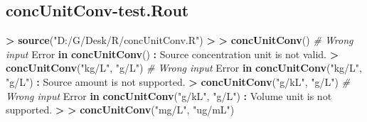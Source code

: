 \documentclass[10pt,]{krantz}
\makeatletter
\newenvironment{Shaded}{\begin{snugshade}}{\end{snugshade}}
\newcommand{\KeywordTok}[1]{\textcolor[rgb]{0.13,0.29,0.53}{\textbf{#1}}}
\newcommand{\StringTok}[1]{\textcolor[rgb]{0.31,0.60,0.02}{#1}}
\newcommand{\CommentTok}[1]{\textcolor[rgb]{0.56,0.35,0.01}{\textit{#1}}}
\newcommand{\ControlFlowTok}[1]{\textcolor[rgb]{0.13,0.29,0.53}{\textbf{#1}}}
\newcommand{\OperatorTok}[1]{\textcolor[rgb]{0.81,0.36,0.00}{\textbf{#1}}}
\newcommand{\ErrorTok}[1]{\textcolor[rgb]{0.64,0.00,0.00}{\textbf{#1}}}
\newcommand{\NormalTok}[1]{#1}
\newenvironment{kframe}{%
\medskip{}
\setlength{\fboxsep}{.8em}
 \def\at@end@of@kframe{}%
 \ifinner\ifhmode%
  \def\at@end@of@kframe{\end{minipage}}%
  \begin{minipage}{\columnwidth}%
 \fi\fi%
 \def\FrameCommand##1{\hskip\@totalleftmargin \hskip-\fboxsep
 \colorbox{shadecolor}{##1}\hskip-\fboxsep
     \hskip-\linewidth \hskip-\@totalleftmargin \hskip\columnwidth}%
 \MakeFramed {\advance\hsize-\width
   \@totalleftmargin\z@ \linewidth\hsize
   \@setminipage}}%
 {\par\unskip\endMakeFramed%
 \at@end@of@kframe}
\renewenvironment{Shaded}{\begin{kframe}}{\end{kframe}}
\theoremstyle{definition}
\theoremstyle{definition}
\theoremstyle{remark}
\makeatother
\begin{document}
\subsection{concUnitConv-test.Rout}\label{concunitconv-test.rout}

\begin{Shaded}
\begin{Highlighting}[]
\OperatorTok{>}\StringTok{ }\KeywordTok{source}\NormalTok{(}\StringTok{"D:/G/Desk/R/concUnitConv.R"}\NormalTok{)}
\OperatorTok{>}\StringTok{ }
\ErrorTok{>}\StringTok{ }\KeywordTok{concUnitConv}\NormalTok{() }\CommentTok{# Wrong input}
\NormalTok{Error }\ControlFlowTok{in} \KeywordTok{concUnitConv}\NormalTok{() }\OperatorTok{:}\StringTok{ }\NormalTok{Source concentration unit is not valid.}
\OperatorTok{>}\StringTok{ }\KeywordTok{concUnitConv}\NormalTok{(}\StringTok{"kg/L"}\NormalTok{, }\StringTok{"g/L"}\NormalTok{) }\CommentTok{# Wrong input}
\NormalTok{Error }\ControlFlowTok{in} \KeywordTok{concUnitConv}\NormalTok{(}\StringTok{"kg/L"}\NormalTok{, }\StringTok{"g/L"}\NormalTok{) }\OperatorTok{:}\StringTok{ }\NormalTok{Source amount is not supported.}
\OperatorTok{>}\StringTok{ }\KeywordTok{concUnitConv}\NormalTok{(}\StringTok{"g/kL"}\NormalTok{, }\StringTok{"g/L"}\NormalTok{) }\CommentTok{# Wrong input}
\NormalTok{Error }\ControlFlowTok{in} \KeywordTok{concUnitConv}\NormalTok{(}\StringTok{"g/kL"}\NormalTok{, }\StringTok{"g/L"}\NormalTok{) }\OperatorTok{:}\StringTok{ }\NormalTok{Volume unit is not supported.}
\OperatorTok{>}\StringTok{ }
\ErrorTok{>}\StringTok{ }\KeywordTok{concUnitConv}\NormalTok{(}\StringTok{"mg/L"}\NormalTok{, }\StringTok{"ug/mL"}\NormalTok{)}
  

\end{Highlighting}
\end{Shaded}
\end{document}
